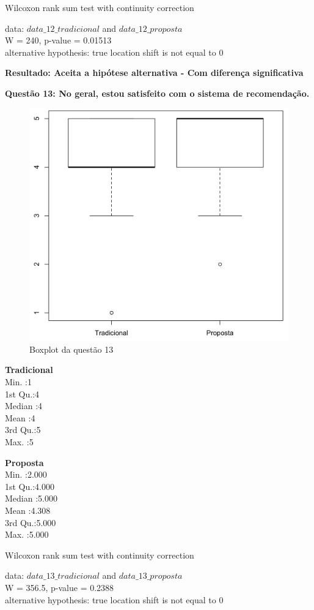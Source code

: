 Wilcoxon rank sum test with continuity correction

\noindent
data:  $data\_12\_tradicional$ and $data\_12\_proposta$\\
W = 240, p-value = 0.01513\\
alternative hypothesis: true location shift is not equal to 0

\textbf{Resultado: Aceita a hipótese alternativa - Com diferença significativa}

\newpage
\textbf{Questão 13: No geral, estou satisfeito com o sistema de recomendação.}

\begin{figure}[htb]
  \caption{\label{fig:questao13-boxplot}Boxplot da questão 13}
  \begin{center}
      \includegraphics[scale=0.4]{./Figuras/questao13-boxplot.png}
  \end{center}
\end{figure}

\begin{multicols}{2}

\noindent\textbf{Tradicional}\\
Min.   :1\\
1st Qu.:4\\
Median :4\\
Mean   :4\\
3rd Qu.:5\\
Max.   :5\\
\columnbreak

\noindent\textbf{Proposta}\\
Min.   :2.000\\
1st Qu.:4.000\\
Median :5.000\\
Mean   :4.308\\
3rd Qu.:5.000\\
Max.   :5.000
\end{multicols}

Wilcoxon rank sum test with continuity correction

\noindent
data:  $data\_13\_tradicional$ and $data\_13\_proposta$\\
W = 356.5, p-value = 0.2388\\
alternative hypothesis: true location shift is not equal to 0
